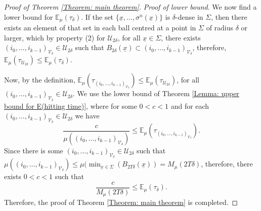 \documentclass[11pt, reqno]{amsart}
\theoremstyle{plain}%
\theoremstyle{definition}
\theoremstyle{definition}
\def\U{\ensuremath{\mathcal U}}
\def\E{\mathbb E}
\def\st{such that }
\def\ulx{\underline{x}}
\numberwithin{equation}{section}
\begin{document}
\begin{proof}[ Proof of Theorem \ref{Theorem: main theorem}]
\textit{ Proof of lower bound}. We now find a lower bound for $\E_\mu(\tau_\delta)$. If the set $\{\ulx,\ldots,\sigma^n(\ulx)\}$ is $\delta$-dense in $\Sigma$, then there exists an element of that set in each ball centred at a point in $\Sigma$ of radius $\delta$ or larger, which by property (2) for $\U_{2\delta}$, for all $\ulx\in \Sigma$, there exists $(i_0,\ldots,i_{k-1})_{\mathcal{V}_\delta}\in \U_{2\delta}$ \st $B_{2\delta}(\ulx)\subset (i_0,\ldots,i_{k-1})_{\mathcal{V}_\delta}$, therefore,  $\E_\mu(\tau_{\U_{2\delta}})\le \E_\mu(\tau_\delta)$. 

Now, by the definition, $\E_\mu(\tau_{(i_0,\ldots,i_{k-1})_{\mathcal{V}_\delta}})\le\E_\mu(\tau_{\U_{2\delta}})$, for all $(i_0,\ldots,i_{k-1})_{\mathcal{V}_\delta}\in\U_{2\delta}$. We use the lower bound of Theorem \ref{Lemma: upper bound for E(hitting time)}, where for some $0<c<1$ and for each  $(i_0,\ldots,i_{k-1})_{\mathcal{V}_\delta}\in\U_{2\delta}$ we have
$$ \frac{c}{\mu((i_0,\ldots,i_{k-1})_{\mathcal{V}_\delta})} \le\E_\mu(\tau_{(i_0,\ldots,i_{k-1})_{\mathcal{V}_\delta}}).$$
Since there is some $(i_0,\ldots,i_{k-1})_{\mathcal{V}_\delta}\in \U_{2\delta} $ \st $\mu((i_0,\ldots,i_{k-1})_{\mathcal{V}_\delta})\le \mu (\min_{\ulx\in \Sigma}(B_{2T\delta}(\ulx))=M_\mu({2T\delta})$, therefore, there exists $0<c<1$ \st $$\frac{c}{M_\mu({2T\delta})}\le \E_\mu(\tau_\delta).$$
Therefore, the proof of Theorem \ref{Theorem: main theorem} is completed.
\end{proof}






    
\end{document}
